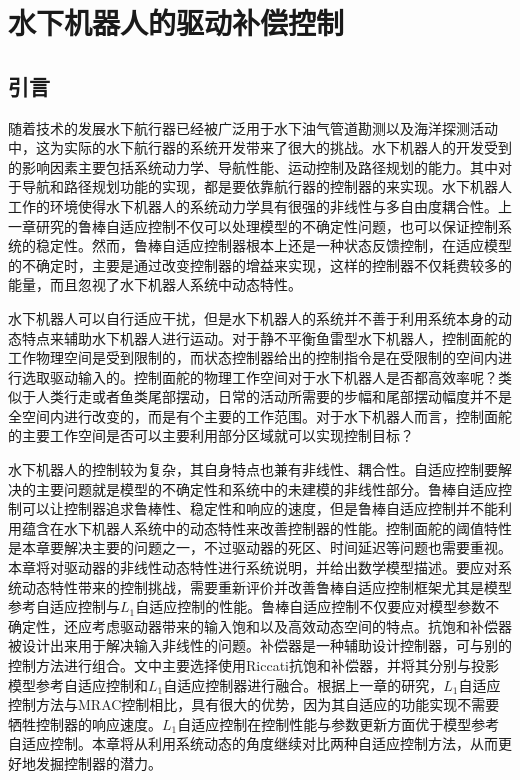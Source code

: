 
\chapter{水下机器人的驱动补偿控制 }

\label{chap:actuator_nonlinearities}
\section{引言 }

随着技术的发展水下航行器已经被广泛用于水下油气管道勘测以及海洋探测活动中，这为实际的水下航行器的系统开发带来了很大的挑战。水下机器人的开发受到的影响因素主要包括系统动力学、导航性能、运动控制及路径规划的能力。其中对于导航和路径规划功能的实现，都是要依靠航行器的控制器的来实现\cite{richter2016polynomial}。水下机器人工作的环境使得水下机器人的系统动力学具有很强的非线性与多自由度耦合性。上一章研究的鲁棒自适应控制不仅可以处理模型的不确定性问题，也可以保证控制系统的稳定性。然而，鲁棒自适应控制器根本上还是一种状态反馈控制，在适应模型的不确定时，主要是通过改变控制器的增益来实现，这样的控制器不仅耗费较多的能量，而且忽视了水下机器人系统中动态特性。

水下机器人可以自行适应干扰，但是水下机器人的系统并不善于利用系统本身的动态特点来辅助水下机器人进行运动。对于静不平衡鱼雷型水下机器人，控制面舵的工作物理空间是受到限制的，而状态控制器给出的控制指令是在受限制的空间内进行选取驱动输入的。控制面舵的物理工作空间对于水下机器人是否都高效率呢？类似于人类行走或者鱼类尾部摆动，日常的活动所需要的步幅和尾部摆动幅度并不是全空间内进行改变的，而是有个主要的工作范围。对于水下机器人而言，控制面舵的主要工作空间是否可以主要利用部分区域就可以实现控制目标？

水下机器人的控制较为复杂，其自身特点也兼有非线性、耦合性。自适应控制要解决的主要问题就是模型的不确定性和系统中的未建模的非线性部分。鲁棒自适应控制可以让控制器追求鲁棒性、稳定性和响应的速度，但是鲁棒自适应控制并不能利用蕴含在水下机器人系统中的动态特性来改善控制器的性能。控制面舵的阈值特性是本章要解决主要的问题之一，不过驱动器的死区、时间延迟等问题也需要重视。本章将对驱动器的非线性动态特性进行系统说明，并给出数学模型描述。要应对系统动态特性带来的控制挑战，需要重新评价并改善鲁棒自适应控制框架尤其是模型参考自适应控制与$L_1$自适应控制的性能。鲁棒自适应控制不仅要应对模型参数不确定性，还应考虑驱动器带来的输入饱和以及高效动态空间的特点。抗饱和补偿器被设计出来用于解决输入非线性的问题。补偿器是一种辅助设计控制器，可与别的控制方法进行组合。文中主要选择使用Riccati抗饱和补偿器，并将其分别与投影模型参考自适应控制和$L_1$自适应控制器进行融合。根据上一章的研究，$L_1$自适应控制方法与MRAC控制相比，具有很大的优势，因为其自适应的功能实现不需要牺牲控制器的响应速度。$L_1$自适应控制在控制性能与参数更新方面优于模型参考自适应控制。本章将从利用系统动态的角度继续对比两种自适应控制方法，从而更好地发掘控制器的潜力。


